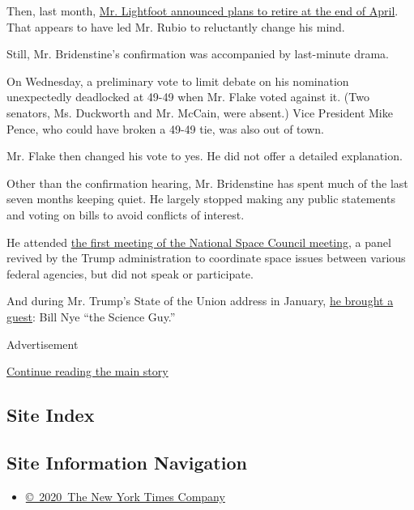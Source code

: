 Then, last month,
\href{https://www.nytimes.com/2018/03/12/science/robert-lightfoot-nasa-retirement.html}{Mr.
Lightfoot announced plans to retire at the end of April}. That appears
to have led Mr. Rubio to reluctantly change his mind.

Still, Mr. Bridenstine's confirmation was accompanied by last-minute
drama.

On Wednesday, a preliminary vote to limit debate on his nomination
unexpectedly deadlocked at 49-49 when Mr. Flake voted against it. (Two
senators, Ms. Duckworth and Mr. McCain, were absent.) Vice President
Mike Pence, who could have broken a 49-49 tie, was also out of town.

Mr. Flake then changed his vote to yes. He did not offer a detailed
explanation.

Other than the confirmation hearing, Mr. Bridenstine has spent much of
the last seven months keeping quiet. He largely stopped making any
public statements and voting on bills to avoid conflicts of interest.

He attended
\href{https://www.nytimes.com/2017/10/05/science/national-space-council-moon-pence.html}{the
first meeting of the National Space Council meeting}, a panel revived by
the Trump administration to coordinate space issues between various
federal agencies, but did not speak or participate.

And during Mr. Trump's State of the Union address in January,
\href{https://bridenstine.house.gov/news/documentsingle.aspx?DocumentID=868}{he
brought a guest}: Bill Nye ``the Science Guy.''

Advertisement

\protect\hyperlink{after-bottom}{Continue reading the main story}

\hypertarget{site-index}{%
\subsection{Site Index}\label{site-index}}

\hypertarget{site-information-navigation}{%
\subsection{Site Information
Navigation}\label{site-information-navigation}}

\begin{itemize}
\tightlist
\item
  \href{https://help.nytimes.com/hc/en-us/articles/115014792127-Copyright-notice}{©~2020~The
  New York Times Company}
\end{itemize}

